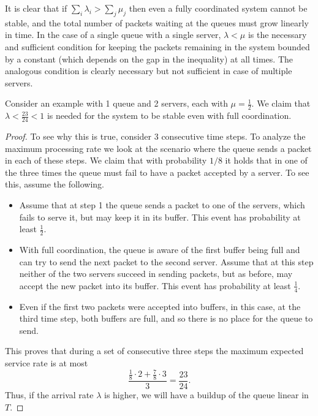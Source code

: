 It is clear that if $\sum_i \lambda_i >\sum_j \mu_j$ then even a fully coordinated system cannot be stable, and the total number of packets waiting at the queues must grow linearly in time. In the case of a single queue with a single server, $\lambda <\mu$ is the necessary and sufficient condition for keeping the packets remaining in the system bounded by a constant (which depends on the gap in the inequality) at all times. The analogous condition is clearly necessary but not sufficient in case of multiple servers. 
\begin{lemma}
    Consider an example with 1 queue and 2 servers, each with $\mu=\frac12$. We claim that $\lambda < \frac{23}{24}<1$ is needed for the system to be stable even with full coordination.
\end{lemma}
\begin{proof}
    To see why this is true, consider 3 consecutive time steps. To analyze the maximum processing rate we look at the scenario where the queue sends a packet in each of these steps. We claim that with probability $1/8$ it holds that in one of the three times the queue must fail to have a packet accepted by a server. To see this, assume the following.
    \begin{itemize}
        \item Assume that at step 1 the queue sends a packet to one of the servers, which fails to serve it, but may keep it in its buffer. This event has probability at least $\frac12$. 
        \item With full coordination, the queue is aware of the first buffer being full and can try to send the next packet to the second server. Assume that at this step neither of the two servers succeed in sending packets, but as before, may accept the new packet into its buffer. This event has probability at least $\frac14$.
        \item Even if the first two packets were accepted into buffers, in this case, at the third time step, both buffers are full, and so there is no place for the queue to send.
    \end{itemize}
This proves that during a set of consecutive three steps the maximum expected service rate is at most $$\frac{\frac18\cdot 2+\frac78 \cdot 3}{3}=\frac{23}{24}.$$
Thus, if the arrival rate $\lambda$ is higher, we will have a buildup of the queue linear in $T$.  
\end{proof}